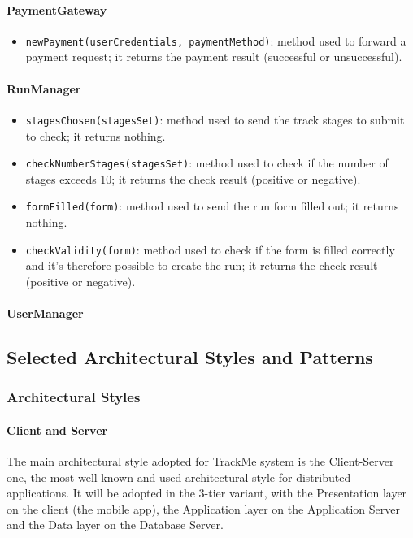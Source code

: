 \paragraph{PaymentGateway}

\begin{itemize}
\item[ ]\texttt{newPayment(userCredentials, paymentMethod)}: method used to forward a payment request; it returns the payment result (successful or unsuccessful).
\end{itemize}

\paragraph{RunManager}

\begin{itemize}
\item[ ]\texttt{stagesChosen(stagesSet)}: method used to send the track stages to submit to check; it returns nothing.

\item[ ]\texttt{checkNumberStages(stagesSet)}: method used to check if the number of stages exceeds 10; it returns the check result (positive or negative).

\item[ ]\texttt{formFilled(form)}: method used to send the run form filled out; it returns nothing.

\item[ ]\texttt{checkValidity(form)}: method used to check if the form is filled correctly and it's therefore possible to create the run; it returns the check result (positive or negative).
\end{itemize}

\paragraph{UserManager}


\subsection{Selected Architectural Styles and Patterns}
\subsubsection{Architectural Styles}
\paragraph{Client and Server}
The main architectural style adopted for TrackMe system is the Client-Server one, the most well known and used architectural style for distributed applications. It will be adopted in the 3-tier variant, with the Presentation layer on the client (the mobile app), the Application layer on the Application Server and the Data layer on the Database Server.

